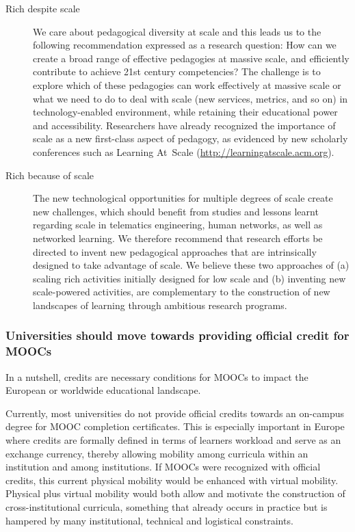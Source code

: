 \documentclass[a4paper,UKenglish]{dagman}
\begin{document}
\begin{description}
\item[Rich despite scale] We care about pedagogical diversity at scale and this leads us to the
  following recommendation expressed as a research question: How can we create a broad range of
  effective pedagogies at massive scale, and efficiently contribute to achieve 21st century
  competencies? The challenge is to explore which of these pedagogies can work effectively at
  massive scale or what we need to do to deal with scale (new services, metrics, and so on) in
  technology-enabled environment, while retaining their educational power and accessibility.
  Researchers have already recognized the importance of scale as a new first-class aspect of
  pedagogy, as evidenced by new scholarly conferences such as Learning At~Scale
  (\url{http://learningatscale.acm.org}).
\item[Rich because of scale] The new technological opportunities for multiple degrees of scale
  create new challenges, which should benefit from studies and lessons learnt regarding scale in
  telematics engineering, human networks, as well as networked learning. We therefore recommend that
  research efforts be directed to invent new pedagogical approaches that are intrinsically designed
  to take advantage of scale. We believe these two approaches of (a) scaling rich activities
  initially designed for low scale and (b) inventing new scale-powered activities, are complementary
  to the construction of new landscapes of learning through ambitious research programs.
\end{description}

\subsubsection*{Universities should move towards providing official credit for MOOCs}

In a nutshell, credits are necessary conditions for MOOCs to impact the European or worldwide
educational landscape.

Currently, most universities do not provide official credits towards an on-campus degree for MOOC
completion certificates.  This is especially important in Europe where credits are formally defined
in terms of learners workload and serve as an exchange currency, thereby allowing mobility among
curricula within an institution and among institutions. If MOOCs were recognized with official
credits, this current physical mobility would be enhanced with virtual mobility.  Physical plus
virtual mobility would both allow and motivate the construction of cross-institutional curricula,
something that already occurs in practice but is hampered by many institutional, technical and
logistical constraints.
\end{document}
